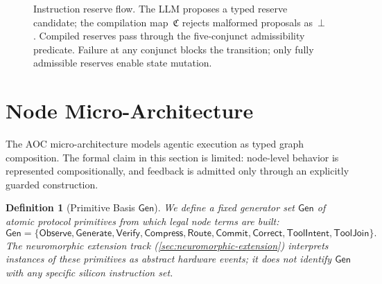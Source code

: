 \documentclass[11pt]{article}
\newtheorem{definition}{Definition}[section]
\theoremstyle{remark}
\newcommand{\AOC}{\textup{\textsc{AOC}}}
\newcommand{\Adm}{\mathrm{Adm}}
\begin{document}
\begin{figure}[H]
\caption{Instruction reserve flow.  The LLM proposes a typed reserve candidate; the compilation map~$\mathfrak{C}$ rejects malformed proposals as~$\bot$.  Compiled reserves pass through the five-conjunct admissibility predicate.  Failure at any conjunct blocks the transition; only fully admissible reserves enable state mutation.}
\label{fig:reserve-flow}
\end{figure}

\newpage
\section{Node Micro-Architecture}

The \AOC{} micro-architecture models agentic execution as typed graph composition. The formal claim in this section is limited: node-level behavior is represented compositionally, and feedback is admitted only through an explicitly guarded construction.

\begin{definition}[Primitive Basis $\mathsf{Gen}$]
We define a fixed generator set $\mathsf{Gen}$ of atomic protocol primitives from which legal node terms are built:
\[
\mathsf{Gen}=\{\mathsf{Observe},\mathsf{Generate},\mathsf{Verify},\mathsf{Compress},\mathsf{Route},\mathsf{Commit},\mathsf{Correct},\mathsf{ToolIntent},\mathsf{ToolJoin}\}.
\]
The neuromorphic extension track (\cref{sec:neuromorphic-extension}) interprets instances of these primitives as abstract hardware events; it does not identify $\mathsf{Gen}$ with any specific silicon instruction set.
\end{definition}

\begin{center}
\end{center}
\end{document}
